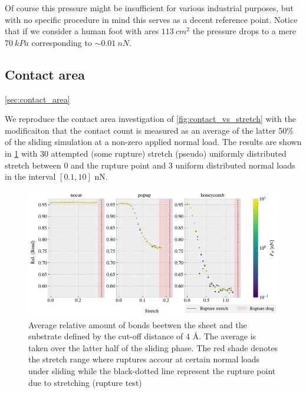 Of course this pressure might be insufficient for various industrial purposes,
but with no specific procedure in mind this serves as a decent reference point.
Notice that if we consider a human foot with ares $\SI{113}{cm^2}$ the pressure
drops to a mere $\SI{70}{kPa}$ corresponding to $\sim \SI{0.01}{nN}$.





\subsection{Contact area}\cref{sec:contact_area}

We reproduce the contact area investigation of \cref{fig:contact_vs_stretch} with the modificaiton that the contact count is measured as an average of the latter 50\% of the sliding simulation at a non-zero applied normal load. The results are shown in \cref{fig:multi_stretch_contact} with 30 attempted (some rupture) stretch (pseudo) uniformly distributed stretch between 0 and the rupture point and 3 uniform distributed normal loads in the interval $[0.1, 10]$ nN. 


\begin{figure}[H]
  \centering
  \includegraphics[width=\linewidth]{figures/baseline/multi_stretch_area_compare.pdf}
  \caption{Average relative amount of bonds beetwen the sheet and the substrate defined by the cut-off distance of 4 Å. The average is taken over the latter half of the sliding phase. The red shade denotes the stretch range where ruptures accour at certain normal loads under sliding while the black-dotted line represent the rupture point due to stretching (rupture test)}
  \label{fig:multi_stretch_contact}
\end{figure}

